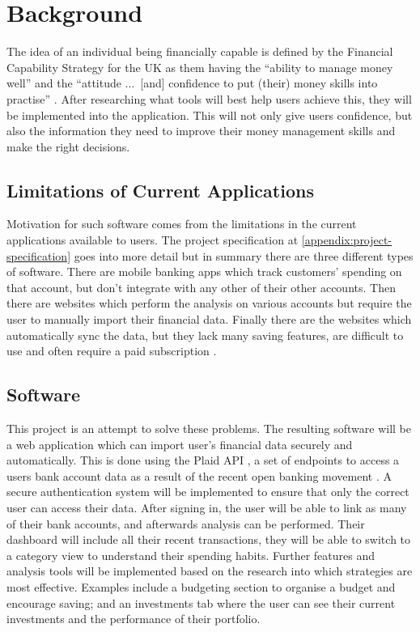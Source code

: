 \section{Background}
\label{sec:background}

The idea of an individual being financially capable is defined by the Financial Capability Strategy for the UK as them having the ``ability to manage money well'' and the ``attitude ...\ [and] confidence to put (their) money skills into practise'' \cite{FinancialCapabilityUK}. After researching what tools will best help users achieve this, they will be implemented into the application. This will not only give users confidence, but also the information they need to improve their money management skills and make the right decisions.


\subsection{Limitations of Current Applications}
Motivation for such software comes from the limitations in the current applications available to users. The project specification at \ref*{appendix:project-specification} goes into more detail but in summary there are three different types of software. There are mobile banking apps which track customers' spending on that account, but don't integrate with any other of their other accounts. Then there are websites which perform the analysis on various accounts but require the user to manually import their financial data. Finally there are the websites which automatically sync the data, but they lack many saving features, are difficult to use and often require a paid subscription \cite{PersonalFinanceAppsComparison}.

\subsection{Software}
This project is an attempt to solve these problems. The resulting software will be a web application which can import user's financial data securely and automatically. This is done using the Plaid API \cite{Plaid}, a set of endpoints to access a users bank account data as a result of the recent open banking movement \cite{OpenBanking}. A secure authentication system will be implemented to ensure that only the correct user can access their data. After signing in, the user will be able to link as many of their bank accounts, and afterwards analysis can be performed. Their dashboard will include all their recent transactions, they will be able to switch to a category view to understand their spending habits. Further features and analysis tools will be implemented based on the research into which strategies are most effective. Examples include a budgeting section to organise a budget and encourage saving; and an investments tab where the user can see their current investments and the performance of their portfolio.


